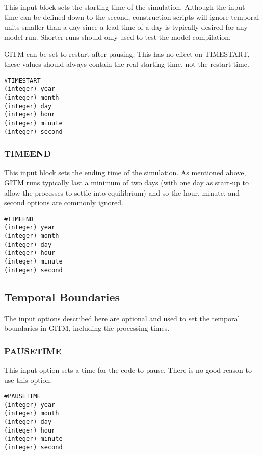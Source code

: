 This input block sets the starting time of the simulation.  Although the input time can be defined down to the second, construction scripts will ignore temporal units smaller than a day since a lead time of a day is typically desired for any model run.  Shorter runs should only used to test the model compilation.

GITM can be set to restart after pausing.  This has no effect on TIMESTART, these values should always contain the real starting time, not the restart time.

\begin{verbatim}
#TIMESTART
(integer) year   
(integer) month 
(integer) day    
(integer) hour    
(integer) minute 
(integer) second
\end{verbatim}

\subsubsection{TIMEEND}
\label{endtime.sec}

This input block sets the ending time of the simulation.  As mentioned above, GITM runs typically last a minimum of two days (with one day as start-up to allow the processes to settle into equilibrium) and so the hour, minute, and second options are commonly ignored.

\begin{verbatim}
#TIMEEND
(integer) year    
(integer) month
(integer) day     
(integer) hour    
(integer) minute  
(integer) second  
\end{verbatim}


\subsection{Temporal Boundaries}
\label{time.sec}

The input options described here are optional and used to set the temporal boundaries in GITM, including the processing times.

\subsubsection{PAUSETIME}
\label{pausetime.sec}

This input option sets a time for the code to pause.  There is no good reason to use this option.

\begin{verbatim}
#PAUSETIME
(integer) year
(integer) month 
(integer) day 
(integer) hour 
(integer) minute 
(integer) second
\end{verbatim}


